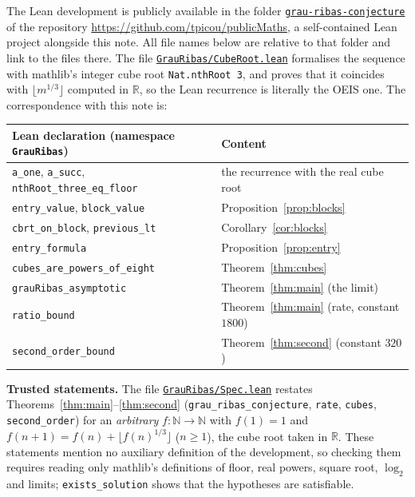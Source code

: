 \documentclass[11pt]{amsart}
\theoremstyle{remark}
\newcommand{\lean}[1]{\texttt{#1}}
\begin{document}
The Lean development is publicly available in the folder
\href{https://github.com/tpicou/publicMaths/tree/main/grau-ribas-conjecture}{\texttt{grau-ribas-conjecture}}
of the repository \url{https://github.com/tpicou/publicMaths}, a self-contained Lean project
alongside this note. All file names below are relative to that folder and link to the files there. The file
\href{https://github.com/tpicou/publicMaths/blob/main/grau-ribas-conjecture/GrauRibas/CubeRoot.lean}{\texttt{GrauRibas/CubeRoot.lean}} formalises the sequence with
mathlib's integer cube root \lean{Nat.nthRoot 3}, and proves that it coincides with
$\lfloor m^{1/3}\rfloor$ computed in $\mathbb R$, so the Lean recurrence is literally the OEIS one.
The correspondence with this note is:

\medskip
\begin{center}
\begin{tabular}{ll}
\toprule
Lean declaration (namespace \lean{GrauRibas}) & Content\\
\midrule
\lean{a\_one}, \lean{a\_succ}, \lean{nthRoot\_three\_eq\_floor} & the recurrence with the real cube root\\
\lean{entry\_value}, \lean{block\_value} & Proposition~\ref{prop:blocks}\\
\lean{cbrt\_on\_block}, \lean{previous\_lt} & Corollary~\ref{cor:blocks}\\
\lean{entry\_formula} & Proposition~\ref{prop:entry}\\
\lean{cubes\_are\_powers\_of\_eight} & Theorem~\ref{thm:cubes}\\
\lean{grauRibas\_asymptotic} & Theorem~\ref{thm:main} (the limit)\\
\lean{ratio\_bound} & Theorem~\ref{thm:main} (rate, constant $1800$)\\
\lean{second\_order\_bound} & Theorem~\ref{thm:second} (constant $320$)\\
\bottomrule
\end{tabular}
\end{center}
\medskip

\smallskip
{\sloppy
\noindent\textbf{Trusted statements.} The file \href{https://github.com/tpicou/publicMaths/blob/main/grau-ribas-conjecture/GrauRibas/Spec.lean}{\texttt{GrauRibas/Spec.lean}} restates
Theorems~\ref{thm:main}--\ref{thm:second} (\lean{grau\_ribas\_conjecture}, \lean{rate},
\lean{cubes}, \lean{second\_order}) for an \emph{arbitrary} $f:\mathbb N\to\mathbb N$ with $f(1)=1$
and $f(n+1)=f(n)+\lfloor f(n)^{1/3}\rfloor$ ($n\ge1$), the cube root taken in $\mathbb R$. These
statements mention no auxiliary definition of the development, so checking them requires reading
only mathlib's definitions of floor, real powers, square root, $\log_2$ and limits;
\lean{exists\_solution} shows that the hypotheses are satisfiable.\par}
\end{document}
